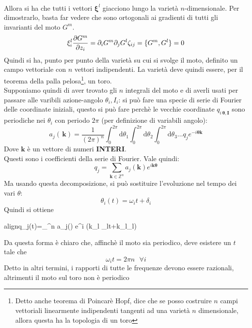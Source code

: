 \documentclass[a4paper,12pt]{article}
\newcommand{\boxedeq}[2]{\begin{empheq}[box={\fboxsep=6pt\fbox}]{align}\label{#1}#2\end{empheq}}
\theoremstyle{plain}
\renewcommand{\vec}[1]{{\boldsymbol{#1}}}
\theoremstyle{definition}
\newcommand{\f}[2]{\frac{#1}{#2}}
\renewcommand{\d}{\text{d}}
\theoremstyle{remark}
\begin{document}
\\Allora si ha che tutti i vettori $\vec{\xi}^l$ giacciono lungo la varietà $n$-dimensionale. Per dimostrarlo, basta far vedere che sono ortogonali ai gradienti di tutti gli invarianti del moto $G^m$.
\[\xi^l_i\pdv{G^m}{z_i}=\partial_i G^m \partial_jG^l \zeta_{ij}=\{G^m,G^l\}=0		\]
Quindi si ha, punto per punto della varietà su cui si svolge il moto, definito un campo vettoriale con $n$ vettori indipendenti. La varietà deve quindi essere, per il teorema della palla pelosa\footnote{Detto anche teorema di Poincarè Hopf, dice che se posso costruire $n$ campi vettoriali linearmente indipendenti tangenti ad una varietà $n$ dimensionale, allora questa ha la topologia di un toro}, un toro.
\\Supponiamo quindi di aver trovato gli $n$ integrali del moto e di averli usati per passare alle varibili azione-angolo $\theta_i,I_i$: si può fare una specie di serie di Fourier delle coordinate iniziali, questo si può fare perchè le vecchie coordinate $q_{i\,\vec{\theta,\vec{I}}}$ sono periodiche nei $\theta_i$ con periodo $2\pi$ (per definizione di variabili angolo):
\[a_{j}(\,\vec{k})=\f{1}{(2\pi)^n}\int_0^{2\pi} \d \theta_1\int_0^{2\pi} \d \theta_2\int_0^{2\pi} \d \theta_3\ldots q_j e^{-i \vec{\theta}\vec{k}}			\]
Dove $\vec{k}$ è un vettore di numeri \textbf{INTERI}.\\
Questi sono i coefficienti della serie di Fourier. Vale quindi:
\[q_j=\sum_{\vec{k}\in \mathbb{Z}^n} a_j(\vec{k})	e^{i \vec{k}\vec{\theta}}			\]
Ma usando questa decomposizione, si può sostituire l'evoluzione nel tempo dei vari $\theta$:\[\theta_i(t)=\omega_it+\delta_i\]
Quindi si ottiene

\boxedeq{Eq8}{q_j(t)=\sum_{\vec{k}\in {}^n} a_j\left(\vec{k}\right)	e^{i (k_l \omega_lt+k_l\delta_l)}	}
Da questa forma è chiaro che, affinchè il moto sia periodico, deve esistere un $t$ tale che \[\omega_i t=2\pi n	\:\:\:\forall i	\]
Detto in altri termini, i rapporti di tutte le frequenze devono essere razionali, altrimenti il moto sul toro non è periodico
\end{document}

